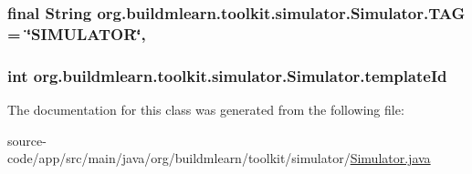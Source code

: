 \subsubsection[{\texorpdfstring{T\+AG}{TAG}}]{\setlength{\rightskip}{0pt plus 5cm}final String org.\+buildmlearn.\+toolkit.\+simulator.\+Simulator.\+T\+AG = \char`\"{}S\+I\+M\+U\+L\+A\+T\+OR\char`\"{}\hspace{0.3cm}{\ttfamily [static]}, {\ttfamily [private]}}\hypertarget{classorg_1_1buildmlearn_1_1toolkit_1_1simulator_1_1Simulator_a5ed469eea2cb2b6dd491414d8c4064d8}{}\label{classorg_1_1buildmlearn_1_1toolkit_1_1simulator_1_1Simulator_a5ed469eea2cb2b6dd491414d8c4064d8}
\subsubsection[{\texorpdfstring{template\+Id}{templateId}}]{\setlength{\rightskip}{0pt plus 5cm}int org.\+buildmlearn.\+toolkit.\+simulator.\+Simulator.\+template\+Id\hspace{0.3cm}{\ttfamily [private]}}\hypertarget{classorg_1_1buildmlearn_1_1toolkit_1_1simulator_1_1Simulator_ae975e80d8437086c05a55cf7407f6d35}{}\label{classorg_1_1buildmlearn_1_1toolkit_1_1simulator_1_1Simulator_ae975e80d8437086c05a55cf7407f6d35}


The documentation for this class was generated from the following file\+:\begin{DoxyCompactItemize}
\item 
source-\/code/app/src/main/java/org/buildmlearn/toolkit/simulator/\hyperlink{Simulator_8java}{Simulator.\+java}\end{DoxyCompactItemize}
